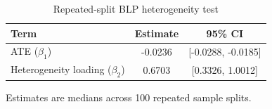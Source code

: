 \begin{table}[htbp]
\centering
\begin{threeparttable}
\caption{Repeated-split BLP heterogeneity test}
\label{tab:blp_results}
\begin{tabular}{lcc}
\toprule
Term & Estimate & 95\% CI \\
\midrule
ATE ($\beta_1$) & -0.0236 & [-0.0288, -0.0185] \\
Heterogeneity loading ($\beta_2$) & 0.6703 & [0.3326, 1.0012] \\
\bottomrule
\end{tabular}
\begin{tablenotes}[flushleft]
\footnotesize
\item Estimates are medians across 100 repeated sample splits.
\end{tablenotes}
\end{threeparttable}
\end{table}
